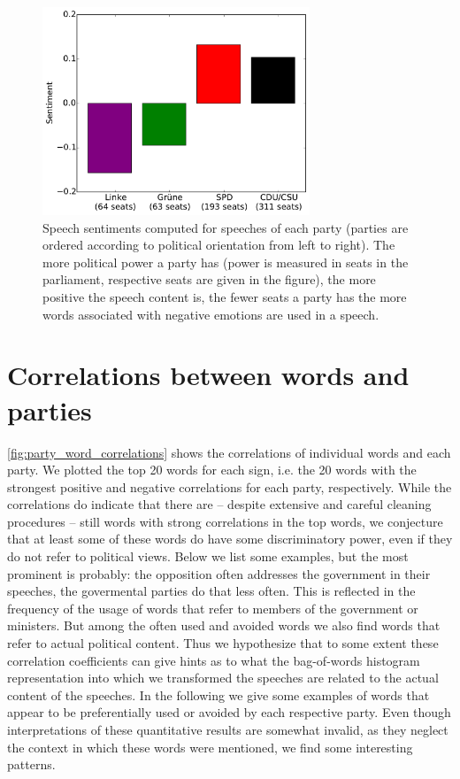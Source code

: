 \documentclass{article} %
\begin{document}
\begin{figure}
\begin{center}
\includegraphics[width=8cm]{party_sentiments.pdf} 
%
\end{center}
\caption{
\label{fig:party_sentiments}
Speech sentiments computed for speeches of each party (parties are ordered according to political orientation from left to right). The more political power a party has (power is measured in seats in the parliament, respective seats are given in the figure), the more positive the speech content is, the fewer seats a party has the more words associated with negative emotions are used in a speech.
}
\end{figure}

\section{Correlations between words and parties}\label{sec:word_party_correlations}

\autoref{fig:party_word_correlations} shows the correlations of individual words and each party. We plotted the top 20 words for each sign, i.e. the 20 words with the strongest positive and negative correlations for each party, respectively. While the correlations do indicate that there are -- despite extensive and careful cleaning procedures -- still words with strong correlations in the top words, we conjecture that at least some of these words do have some discriminatory power, even if they do not refer to political views. Below we list some examples, but the most prominent is probably: the opposition often addresses the government in their speeches, the govermental parties do that less often. This is reflected in the frequency of the usage of words that refer to members of the government or ministers. But among the often used and avoided words we also find words that refer to actual political content. Thus we hypothesize that to some extent these correlation coefficients can give hints as to what the bag-of-words histogram representation into which we transformed the speeches are related to the actual content of the speeches. In the following we give some examples of words that appear to be preferentially used or avoided by each respective party. Even though interpretations of these quantitative results are somewhat invalid, as they neglect the context in which these words were mentioned, we find some interesting patterns. 
\end{document}
